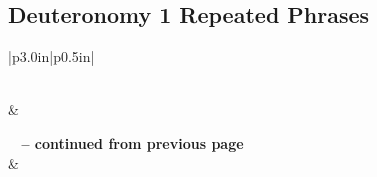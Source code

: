 \subsection{Deuteronomy 1 Repeated Phrases}


\normalsize
 
\begin{center}
\begin{longtable}{|p{3.0in}|p{0.5in}|}
\caption[Deuteronomy 1 Repeated Phrases]{Deuteronomy 1 Repeated Phrases}\label{table:Repeated Phrases Deuteronomy 1} \\
\hline {} &  \\ \hline 
\endfirsthead
 
{{\bfseries \tablename\ \thetable{} -- continued from previous page}} \\  
\hline {} &  \\ \hline 
\endhead
 

\end{longtable}
\end{center}
